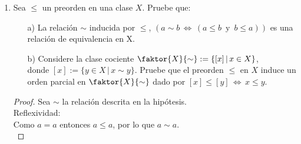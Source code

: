 \documentclass{article}
\begin{document}
\begin{enumerate}[label=\textbf{Ej \arabic*.}]
\begin{proof}
Por el diagrama (1) se puede apreciar que $\gamma=\{\gamma_\beta\colon B\longrightarrow FG(B)\}, \\ 
(\gamma\colon 1_{\mathscr{B}}\longrightarrow FG)$ es una equivalencia natural.
Entonces para cada $A\in \mathscr{A}$ se tiene el isomorfismo $\gamma_{F(A)}\colon F(A)\longrightarrow FGF(A)$ en $\mathscr{B}$; 
en particular, como $F$ es fiel, existe $\psi'_A\colon A\longrightarrow GF(A)$ tal que $F(\psi'_A)=\gamma_{F(A)}$.\\
Por otro lado, como $\gamma_{F(A)}$ es un isomorfismo, entonces existe \\ $\gamma^{-1}_{F(A)}\colon FGF(A)\longrightarrow F(A)$ tal que 
$\gamma^{-1}_{F(A)}\gamma_{F(A)}=1_{F(A)}$. Y como $F$ es pleno, existe $\psi_A\colon GF(A)\longrightarrow A$ tal que 
$F(\psi_A)=\gamma^{-1}_{F(A)}.$ Por lo tanto $F(\psi_A\psi'_A)=1_{F(A)}$; y como $F$ es fiel, entonces $\psi_A\psi'_A=1_A$ Análogamente
$\psi'_A\psi_A=1_{GF(A)}$ por lo que $\psi_A$ es isomorfismo.\\

Por último veamos que el siguiente diagrama
\begin{equation*}
\commutativesquare{A=GF(A),B=A,C=GF(A'),D=A',f=\psi_A,g=GF(\alpha),h=\alpha,k=\psi_{A'},}\quad\ldots (2)
\end{equation*}
conmuta en $A$.\\

En efecto, aplicando $F$ al diagrama anterior obtenemos que 
\begin{equation*}
\commutativesquare{A=FGF(A),B=F(A),C=FGF(A'),D=F(A'),f=F(\psi_A),g=FGF(\alpha),h=F(\alpha),k=F(\psi_{A'}),}
\end{equation*}
Como $F(\psi_A)=\gamma^{-1}_{F(A)}$ y $F(\psi_{A'})=\gamma^{-1}_{F(A')}$, reemplazando a $\beta$ del diagrama (1) por $F(\alpha)$, obtenemos
que el diagrama anterior conmuta. Peo $F$ es fiel, entonces el diagrama (2) conmuta y así $\psi\colon GF\longrightarrow 1_{\mathscr{A}}$ es una
equivalencia natural.
\end{proof}

\item Sea $\leq$ un preorden en una clase $X$. Pruebe que:
\begin{itemize}
\item[a)] La relación $\sim$ inducida por $\leq$, $\left(a\sim b\,\iff \, (a\leq b\,\,\,\text{y}\,\,\,b\leq a)\right)$ 
es una relación de equivalencia en X.\\
\item[b)] Considere la clase cociente $\faktor{X}{\sim}:=\{[x]\,|\, x\in X\}$, \\
donde $[x]:=\{y\in X\,|\, x\sim y\}.$ Pruebe que el preorden $\leq $ en $X$ 
induce un orden parcial en $\faktor{X}{\sim}$ dado por $[x]\leq [y]\, \iff \, x\leq y.$
\end{itemize}
\begin{proof}
 Sea $\sim$ la relación descrita en la hipótesis.\\
Reflexividad:\\
Como $a=a$ entonces $a\leq a$, por lo que $a\sim a$.\\


\end{proof}
\end{enumerate}
\end{document}
